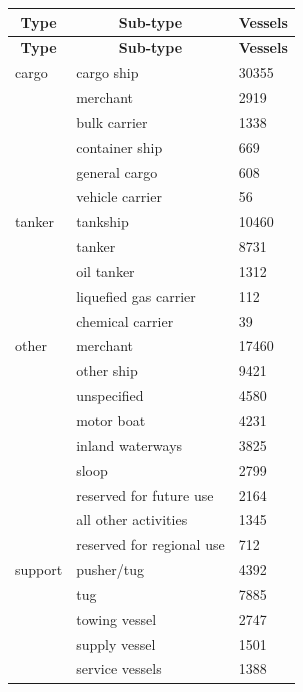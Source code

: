 \begin{longtable}{l|l|l}
\hline \multicolumn{1}{|c|}{\textbf{Type}} & \multicolumn{1}{c|}{\textbf{Sub-type}} & \multicolumn{1}{c|}{\textbf{Vessels}} \\ \hline 
\endfirsthead

\hline \multicolumn{1}{|c|}{\textbf{Type}} &
\multicolumn{1}{c|}{\textbf{Sub-type}} &
\multicolumn{1}{c|}{\textbf{Vessels}} \\ \hline 
\endhead

\endfoot
    cargo & cargo ship & 30355 \\
          & merchant & 2919 \\
          & bulk carrier & 1338 \\
          & container ship & 669 \\
          & general cargo & 608 \\
          & vehicle carrier & 56 \\
    tanker & tankship & 10460 \\
           & tanker   & 8731 \\
           & oil tanker & 1312 \\
           & liquefied gas carrier & 112 \\
           & chemical carrier & 39 \\
    other & merchant & 17460 \\
          & other ship & 9421 \\
          & unspecified & 4580 \\
          & motor boat & 4231 \\
          & inland waterways & 3825 \\
          & sloop & 2799 \\
          & reserved for future use & 2164 \\
          & all other activities & 1345 \\
          & reserved for regional use & 712 \\
  support & pusher/tug & 4392 \\
          & tug & 7885 \\
          & towing vessel & 2747 \\
          & supply vessel & 1501 \\
          & service vessels & 1388 \\

\end{longtable}
